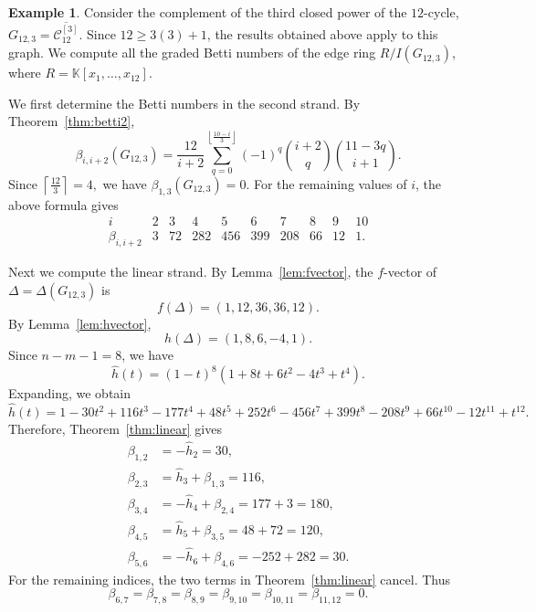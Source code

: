 \documentclass[12pt,reqno]{amsart}
\theoremstyle{definition}
\newtheorem{example}[theorem]{Example}
\numberwithin{equation}{section}
\def\C{\mathcal{C}}
\def\K{\mathbb{K}}
\begin{document}
\begin{example}\label{ex:C123}
	Consider the complement of the third closed power of the $12$-cycle, \( G_{12,3}=\overline{\C_{12}^{[3]}}. \)
	Since $12\geq3(3)+1$, the results obtained above apply to this graph.
	We compute all the graded Betti numbers of the edge ring
	$R/I(G_{12,3})$, where
	$R=\K[x_1,\ldots,x_{12}]$.
	
	We first determine the Betti numbers in the second strand. By
	Theorem~\ref{thm:betti2},
	\[
	\beta_{i,i+2}(G_{12,3})
	=
	\frac{12}{i+2}
	\sum_{q=0}^{\left\lfloor\frac{10-i}{3}\right\rfloor}
	(-1)^q
	\binom{i+2}{q}
	\binom{11-3q}{i+1}.
	\]
	Since \( \left\lceil\frac{12}{3}\right\rceil=4, \)
	we have $\beta_{1,3}(G_{12,3})=0$. For the remaining values of $i$,
	the above formula gives
	\[
	\begin{array}{c|ccccccccc}
		i&2&3&4&5&6&7&8&9&10\\
		\hline
		\beta_{i,i+2}
		&3&72&282&456&399&208&66&12&1.
	\end{array}
	\]
	
	Next we compute the linear strand. By Lemma~\ref{lem:fvector}, the
	$f$-vector of $\Delta=\Delta(G_{12,3})$ is
	\[
	f(\Delta)=(1,12,36,36,12).
	\]
	By Lemma~\ref{lem:hvector},
	\[
	h(\Delta)=(1,8,6,-4,1).
	\]
	Since $n-m-1=8$, we have
	\[
	\widehat h(t)
	=
	(1-t)^8(1+8t+6t^2-4t^3+t^4).
	\]
	Expanding, we obtain
	\[
	\widehat h(t)
	=
	1-30t^2+116t^3-177t^4+48t^5+252t^6
	-456t^7+399t^8-208t^9
	+66t^{10}-12t^{11}+t^{12}.
	\]
	Therefore, Theorem~\ref{thm:linear} gives
	\[
	\begin{aligned}
		\beta_{1,2}
		&=-\widehat h_2=30,\\
		\beta_{2,3}
		&=\widehat h_3+\beta_{1,3}=116,\\
		\beta_{3,4}
		&=-\widehat h_4+\beta_{2,4}=177+3=180,\\
		\beta_{4,5}
		&=\widehat h_5+\beta_{3,5}=48+72=120,\\
		\beta_{5,6}
		&=-\widehat h_6+\beta_{4,6}=-252+282=30.
	\end{aligned}
	\]
	For the remaining indices, the two terms in
	Theorem~\ref{thm:linear} cancel. Thus
	\[
	\beta_{6,7}
	=
	\beta_{7,8}
	=
	\beta_{8,9}
	=
	\beta_{9,10}
	=
	\beta_{10,11}
	=
	\beta_{11,12}
	=
	0.
	\]
	

\end{example}
\end{document}
